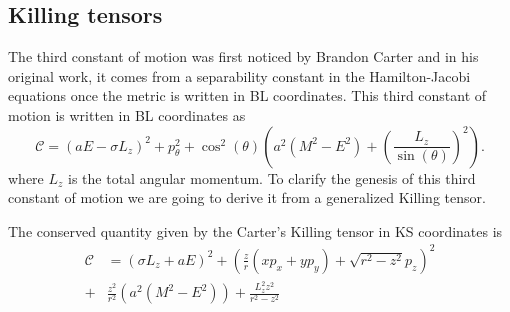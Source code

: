  \subsection{Killing tensors}

The third constant of motion was first noticed by Brandon Carter \cite{carter1987separability,carter1968global} and in his original work, it comes from a separability constant in the Hamilton-Jacobi equations once the metric is written in \gls{BL} coordinates. This third constant of motion is written in \gls{BL} coordinates as
\begin{equation}
 \mathcal{C}=(a E-\sigma L_z)^2 +p^2_{\theta} +\cos^2(\theta) \left( a^2(M^2-E^2)+\left( \frac{L_z}{\sin(\theta)} \right)^2 \right).
\end{equation}
where $L_z$ is the total angular momentum. To clarify the genesis of this third constant of motion we are going to derive it from a generalized Killing tensor.
\begin{lemma}
 The conserved quantity given by the Carter's Killing tensor in \gls{KS} coordinates is
\begin{equation}
\begin{aligned}
 \mathcal{C}&= (\sigma L_z+a E)^2 + \left( \frac{z}{r}(x p_x +y p_y)+\sqrt{r^2-z^2} p_z \right)^2 \\
 +&\frac{z^2}{r^2} \left( a^2(M^2-E^2) \right)+ \frac{L_z^2 z^2}{r^2-z^2} 
\end{aligned}
\end{equation}
\end{lemma}
